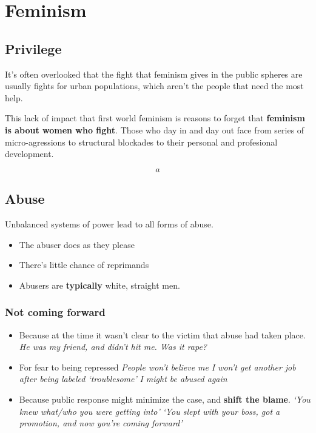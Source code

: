 
\section{Feminism} 

\subsection{Privilege} 

It's often overlooked that the fight that feminism gives in the public spheres are usually fights for urban populations, which aren't the people that need the most help.

This lack of impact that first world feminism is reasons to forget that \textbf{feminism is about women who fight}. Those who day in and day out face from series of micro-agressions to structural blockades to their personal and profesional development.

\[
	a
\]
	
\subsection{Abuse} 

Unbalanced systems of power lead to all forms of abuse.
\begin{itemize}
	\item The abuser does as they please
	\item There's little chance of reprimands
	\item Abusers are \textbf{typically} white, straight men.
\end{itemize}


\subsubsection{Not coming forward}

\begin{itemize}
	\item Because at the time it wasn't clear to the victim that abuse had taken place.
	\subitem \textit{He was my friend, and didn't hit me. Was it rape?}
	\item For fear to being repressed
	\subitem \textit{People won't believe me}
	\subitem \textit{I won't get another job after being labeled `troublesome'}
	\subitem \textit{I might be abused again}
	\item Because public response might minimize the case, and \textbf{shift the blame}.
	\subitem \textit{`You knew what/who you were getting into'}
	\subitem \textit{`You slept with your boss, got a promotion, and now you're coming forward'}
\end{itemize}


